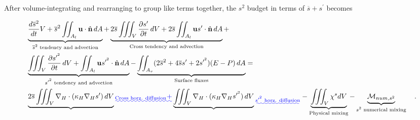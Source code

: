 \documentclass[draft]{agujournal2019}
\providecommand{\DIFadd}[1]{{\protect\color{blue}\uwave{#1}}} %
\providecommand{\DIFaddbegin}{} %
\providecommand{\DIFaddend}{} %
\providecommand{\DIFdelbegin}{} %
\providecommand{\DIFdelend}{} %
\begin{document}
After volume-integrating and rearranging to group like terms together, the $s^2$ budget in terms of $\overline{s}+s^\prime$ becomes
\begin{linenomath*}
\begin{equation} \label{eq:differences_vint}
    \begin{split}
        \DIFdelbegin %
\DIFdelend \DIFaddbegin & \underbrace{\frac{d \overline{s}^2}{d t} V + \overline{s}^2 \iint_{A_l} \mathbf{u} \cdot \hat{\mathbf{n}} \, dA}\DIFaddend _\text{$\overline{s}^2$ tendency and advection}+ \DIFdelbegin %
\DIFdelend \DIFaddbegin \underbrace{2\overline{s} \iiint_V \frac{\partial s^\prime}{\partial t} \, dV+2\overline{s}\iint_{A_l} \mathbf{u}s^{\prime} \cdot \hat{\mathbf{n}} \, dA}\DIFaddend _\text{Cross tendency and advection} + \\
        \DIFdelbegin %
\DIFdelend \DIFaddbegin & \underbrace{\iiint_V \frac{\partial s^{\prime^2}}{\partial t} \, dV+\iint_{A_l}  \mathbf{u}s^{\prime^2} \cdot \hat{\mathbf{n}} \, dA}\DIFaddend _\text{$s^{\prime^2}$ tendency and advection}-\underbrace{\iint_{A_{v}} (2\overline{s}^2+4 \overline{s} s^\prime+2s^{\prime^2})(E-P) \, dA}_\text{Surface fluxes} = \\ 
        \DIFaddbegin & 
        \underbrace{2 \overline{s} \iiint_{V} \nabla_H \cdot (\kappa_H \nabla_H s^{\prime}) \, dV}\DIFadd{_{\text{Cross horz. diffusion}}+
        }\underbrace{\iiint_{V} \nabla_H \cdot (\kappa_H \nabla_H s^{\prime^2}) \, dV}\DIFadd{_{\text{$s^{\prime^2}$ horz. diffusion}}}\DIFaddend -\underbrace{\iiint_V \chi^s dV}_\text{Physical mixing} - \underbrace{\mathcal{M}_{num, s^2}}_\text{$s^2$ numerical mixing} \quad . 
\end{split}
\end{equation}
\end{linenomath*}
\end{document}
